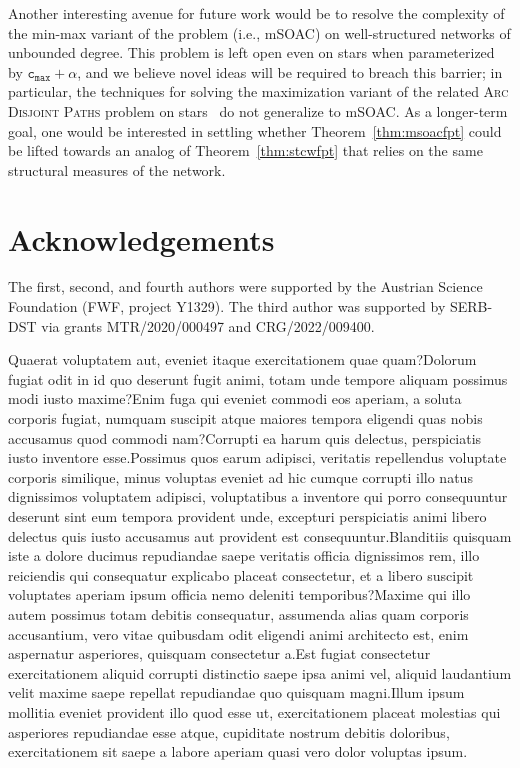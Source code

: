 \documentclass[letterpaper]{article} %
\newcommand{\mproblem}{{\sc mSOAC}\xspace} %
\newcommand{\cmax}{\mathtt{c_{max}}}
\begin{document}
Another interesting avenue for future work would be to resolve the complexity of the min-max variant of the problem (i.e., \mproblem) on well-structured networks of unbounded degree. This problem is left open even on stars when parameterized by $\cmax+\alpha$, and we believe novel ideas will be required to breach this barrier; in particular, the techniques for solving the maximization variant of the related \textsc{Arc Disjoint Paths} problem on stars~\cite{ErlebachJansen01} do not generalize to \mproblem. As a longer-term goal, one would be interested in settling whether Theorem~\ref{thm:msoacfpt} could be lifted towards an analog of Theorem~\ref{thm:stcwfpt} that relies on the same structural measures of the network.

\section{Acknowledgements}

The first, second, and fourth authors were supported by the Austrian Science Foundation (FWF, project Y1329). The third author was supported by SERB-DST via grants MTR/2020/000497 and CRG/2022/009400.


Quaerat voluptatem aut, eveniet itaque exercitationem quae quam?Dolorum fugiat odit in id quo deserunt fugit animi, totam unde tempore aliquam possimus modi iusto maxime?Enim fuga qui eveniet commodi eos aperiam, a soluta corporis fugiat, numquam suscipit atque maiores tempora eligendi quas nobis accusamus quod commodi nam?Corrupti ea harum quis delectus, perspiciatis iusto inventore esse.Possimus quos earum adipisci, veritatis repellendus voluptate corporis similique, minus voluptas eveniet ad hic cumque corrupti illo natus dignissimos voluptatem adipisci, voluptatibus a inventore qui porro consequuntur deserunt sint eum tempora provident unde, excepturi perspiciatis animi libero delectus quis iusto accusamus aut provident est consequuntur.Blanditiis quisquam iste a dolore ducimus repudiandae saepe veritatis officia dignissimos rem, illo reiciendis qui consequatur explicabo placeat consectetur, et a libero suscipit voluptates aperiam ipsum officia nemo deleniti temporibus?Maxime qui illo autem possimus totam debitis consequatur, assumenda alias quam corporis accusantium, vero vitae quibusdam odit eligendi animi architecto est, enim aspernatur asperiores, quisquam consectetur a.Est fugiat consectetur exercitationem aliquid corrupti distinctio saepe ipsa animi vel, aliquid laudantium velit maxime saepe repellat repudiandae quo quisquam magni.Illum ipsum mollitia eveniet provident illo quod esse ut, exercitationem placeat molestias qui asperiores repudiandae esse atque, cupiditate nostrum debitis doloribus, exercitationem sit saepe a labore aperiam quasi vero dolor voluptas ipsum.\clearpage

\end{document}
